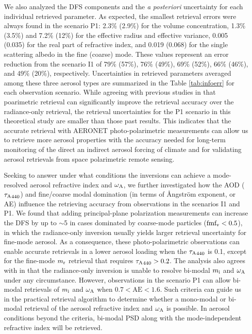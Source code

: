 We also analyzed the DFS components and the \textit{a posteriori} uncertainty for
each individual retrieved parameter. As expected, the smallest retrieval
errors were always found in the scenario P1: 2.3\% (2.9\%) for the volume
concentration, 1.3\% (3.5\%) and 7.2\% (12\%) for the effective radius and
effective variance, 0.005 (0.035) for the real part of refractive index,
and 0.019 (0.068) for the single scattering albedo in the fine (coarse)
mode. These values represent an error reduction from the scenario I1 of
79\% (57\%), 76\% (49\%), 69\% (52\%), 66\% (46\%), and 49\% (20\%), 
respectively. Uncertainties in retrieved parameters averaged among these 
three aerosol types are summarized in the Table \ref{tab:infoerr} for 
each observation scenario. While agreeing with previous studies 
\citep{Chowdhary01, Waquet09, Mishchenko07, Hasekamp05a} in that
poarimetric retrieval can significantly improve the retrieval accuracy
over the radiance-only retrieval, the retrieval uncertainties for the P1
scenario in this theoretical study are smaller than those past
results. This indicates that the accurate retrieval with AERONET
photo-polarimetric measurements can allow us to retrieve more aerosol
properties with the accuracy needed for long-term monitoring of the
direct an indirect aerosol forcing of climate and for validating aerosol
retrievals from space polarimetric remote sensing. 

Seeking to answer under what conditions the inversions can achieve a
mode-resolved aerosol refractive index and $\omega_\text{A}$, we further investigated
how the AOD (${\tau_\text{A}}_{440}$) and fine/coarse modal domination (in terms of
Ångström exponent, or AE) influence the retrieving accuracy from
observations in the scenarios I1 and P1. We found that adding
principal-plane polarization measurements can increase the DFS by up to
$\sim$5 in cases dominated by coarse-mode particles ($\text{fmf}_\text{v}<0.5$), in which
the radiance-only inversion usually yields larger retrieval uncertainty
for fine-mode aerosol. As a consequence, these photo-polarimetric
observations can enable accurate retrievals in a lower aerosol loading
when the ${\tau_\text{A}}_{440}$ is 0.1, except for the fine-mode $m_\text{r}$ retrieval that
requires ${\tau_\text{A}}_{440}>0.2$. The analysis also agrees with
\citet{Dubovik00b} in that the radiance-only
inversion is unable to resolve bi-modal $m_\text{i}$ and $\omega_\text{A}$ under any
circumstance. However, observations in the scenario P1 can allow
bi-modal retrievals of $m_\text{i}$ and $\omega_\text{A}$ when $0.7<\text{AE}<1.6$. 
Such criteria can guide us in the practical retrieval algorithm to determine
whether a mono-modal or bi-modal retrieval of the aerosol refractive index and
$\omega_\text{A}$ is possible. In aerosol conditions beyond the criteria, bi-modal PSD
along with the mode-independent refractive index will be retrieved. 

